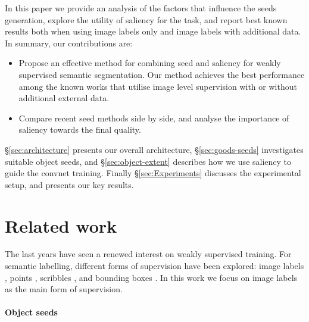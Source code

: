 \documentclass[british,10pt,twocolumn,letterpaper]{article}
\begin{document}
In this paper we provide an analysis of the factors that influence
the seeds generation, explore the utility of saliency for the task,
and report best known results both when using image labels only and
image labels with additional data. In summary, our contributions are: 

\begin{itemize}
\item Propose an effective method for combining seed and saliency for weakly supervised semantic segmentation. Our method achieves the best performance among
the known works that utilise image level supervision with or without
additional external data.
\item Compare recent seed methods side by side, and analyse the
    importance of saliency towards the final quality.
\end{itemize}

\S \ref{sec:architecture} presents our overall architecture,
\S \ref{sec:goods-seeds} investigates suitable object seeds,
and \S \ref{sec:object-extent} describes how we use saliency
to guide the convnet training. Finally \S \ref{sec:Experiments}
discusses the experimental setup, and presents our key results.

\section{\label{sec:Related-work}Related work}

\noindent
The last years have seen a renewed interest on weakly supervised training.
For semantic labelling, different forms of supervision have been explored:
image labels \cite{Pathak2015Iclrw,Pathak2015Iccv,Papandreou2015Iccv,Pinheiro2015Cvpr,Wei2015ArXiv,kolesnikov2016seed},
points \cite{Bearman2015ArXiv}, scribbles \cite{Xu2015CvprWeakSegmentation,Lin2016CvprScribbleSup},
and bounding boxes \cite{Dai2015Iccv,Papandreou2015Iccv,Khoreva2016Arxiv}.
In this work we focus on image labels as the main form of supervision.

\paragraph{Object seeds}
\end{document}
